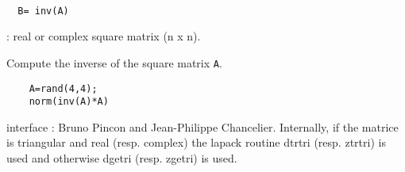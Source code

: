 \begin{mandesc}
   \\ %
\end{mandesc}
\begin{calling_sequence}
\begin{verbatim}
  B= inv(A)  
\end{verbatim}
\end{calling_sequence}
\begin{parameters}
  \begin{varlist}
    : real or complex square matrix (n x n).
  \end{varlist}
\end{parameters}
\begin{mandescription}
  Compute the inverse of the square matrix \verb!A!. 
\end{mandescription}
\begin{examples}
  \begin{Verbatim}
    A=rand(4,4);
    norm(inv(A)*A)
  \end{Verbatim}
\end{examples}
\begin{manseealso}
\end{manseealso}
\begin{authors}
   interface : Bruno Pincon and Jean-Philippe Chancelier. 
   Internally, if the matrice is triangular and real (resp. complex) the lapack routine dtrtri (resp. ztrtri) is used and otherwise dgetri (resp. zgetri) is used.
\end{authors}
